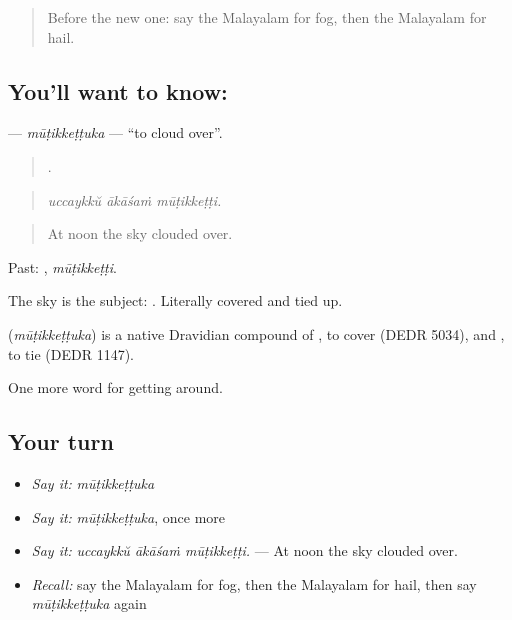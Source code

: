 \label{lesson:ML-C510-mutikkettuka}



\begin{quote}
Before the new one: say the Malayalam for fog, then the Malayalam for hail.
\end{quote}

\subsection*{You'll want to know: }
\textbf{} — \emph{mūṭikkeṭṭuka} — \textquotedblleft{}to cloud over\textquotedblright{}.

\begin{quote}
  .
\end{quote}

\begin{quote}
\emph{uccaykkŭ ākāśaṁ mūṭikkeṭṭi.}
\end{quote}

\begin{quote}
At noon the sky clouded over.
\end{quote}

Past: , \emph{mūṭikkeṭṭi}.

The sky is the subject:  . Literally covered and tied up.

\begin{cousinweb}
\textbf{} (\emph{mūṭikkeṭṭuka}) is a native Dravidian compound of , to cover (DEDR 5034), and , to tie (DEDR 1147).
\end{cousinweb}

\begin{grammarlens}[title={What you've built}]
One more word for getting around.
\end{grammarlens}

\subsection*{Your turn}
\begin{itemize}
\raggedright
  \item \emph{Say it:} \emph{mūṭikkeṭṭuka}
  \item \emph{Say it:} \emph{mūṭikkeṭṭuka}, once more
  \item \emph{Say it:} \emph{uccaykkŭ ākāśaṁ mūṭikkeṭṭi.} — At noon the sky clouded over.
  \item \emph{Recall:} say the Malayalam for fog, then the Malayalam for hail, then say \emph{mūṭikkeṭṭuka} again
\end{itemize}


